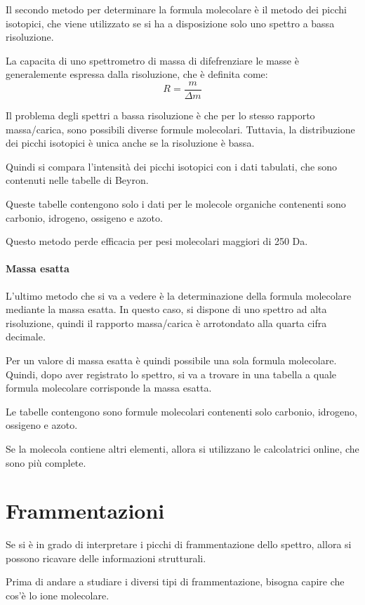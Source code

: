 Il secondo metodo per determinare la formula molecolare è il metodo dei
picchi isotopici, che viene utilizzato se si ha a disposizione solo uno
spettro a bassa risoluzione.

La capacita di uno spettrometro di massa di difefrenziare le masse
è generalemente espressa dalla risoluzione, che è definita come:
\[
  R = \frac{m}{\Delta m}
\]

Il problema degli spettri a bassa risoluzione è che per lo stesso
rapporto massa/carica, sono possibili diverse formule molecolari.
Tuttavia, la distribuzione dei picchi isotopici è unica anche se la
risoluzione è bassa.

Quindi si compara l'intensità dei picchi isotopici con i dati tabulati,
che sono contenuti nelle tabelle di Beyron.

Queste tabelle contengono solo i dati per le molecole organiche
contenenti sono carbonio, idrogeno, ossigeno e azoto.

Questo metodo perde efficacia per pesi molecolari maggiori di 250 Da.

\paragraph{Massa esatta}

L'ultimo metodo che si va a vedere è la determinazione della formula
molecolare mediante la massa esatta. In questo caso, si dispone di uno
spettro ad alta risoluzione, quindi il rapporto massa/carica è
arrotondato alla quarta cifra decimale.

Per un valore di massa esatta è quindi possibile una sola formula
molecolare. Quindi, dopo aver registrato lo spettro, si va a trovare in
una tabella a quale formula molecolare corrisponde la massa esatta.

Le tabelle contengono sono formule molecolari contenenti solo carbonio,
idrogeno, ossigeno e azoto.

Se la molecola contiene altri elementi, allora si utilizzano le
calcolatrici online, che sono più complete.

\section{Frammentazioni}

Se si è in grado di interpretare i picchi di frammentazione dello
spettro, allora si possono ricavare delle informazioni strutturali.

Prima di andare a studiare i diversi tipi di frammentazione, bisogna
capire che cos'è lo ione molecolare.

